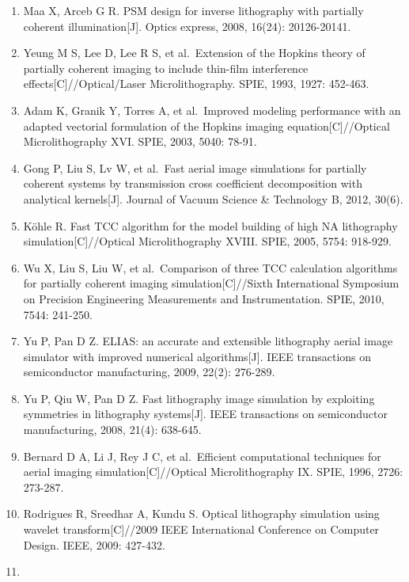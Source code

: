 \documentclass[
  preprint]{elsarticle}
\begin{document}
\begin{enumerate}
  Ma X, Arce G. Binary mask optimization for inverse lithography with
  partially coherent illumination{[}J{]}. Journal of the optical society
  of America A, 2008, 25(12): 2960-2970.
\item
  Maa X, Arceb G R. PSM design for inverse lithography with partially
  coherent illumination{[}J{]}. Optics express, 2008, 16(24):
  20126-20141.
\item
  Yeung M S, Lee D, Lee R S, et al.~Extension of the Hopkins theory of
  partially coherent imaging to include thin-film interference
  effects{[}C{]}//Optical/Laser Microlithography. SPIE, 1993, 1927:
  452-463.
\item
  Adam K, Granik Y, Torres A, et al.~Improved modeling performance with
  an adapted vectorial formulation of the Hopkins imaging
  equation{[}C{]}//Optical Microlithography XVI. SPIE, 2003, 5040:
  78-91.
\item
  Gong P, Liu S, Lv W, et al.~Fast aerial image simulations for
  partially coherent systems by transmission cross coefficient
  decomposition with analytical kernels{[}J{]}. Journal of Vacuum
  Science \& Technology B, 2012, 30(6).
\item
  Köhle R. Fast TCC algorithm for the model building of high NA
  lithography simulation{[}C{]}//Optical Microlithography XVIII. SPIE,
  2005, 5754: 918-929.
\item
  Wu X, Liu S, Liu W, et al.~Comparison of three TCC calculation
  algorithms for partially coherent imaging simulation{[}C{]}//Sixth
  International Symposium on Precision Engineering Measurements and
  Instrumentation. SPIE, 2010, 7544: 241-250.
\item
  Yu P, Pan D Z. ELIAS: an accurate and extensible lithography aerial
  image simulator with improved numerical algorithms{[}J{]}. IEEE
  transactions on semiconductor manufacturing, 2009, 22(2): 276-289.
\item
  Yu P, Qiu W, Pan D Z. Fast lithography image simulation by exploiting
  symmetries in lithography systems{[}J{]}. IEEE transactions on
  semiconductor manufacturing, 2008, 21(4): 638-645.
\item
  Bernard D A, Li J, Rey J C, et al.~Efficient computational techniques
  for aerial imaging simulation{[}C{]}//Optical Microlithography IX.
  SPIE, 1996, 2726: 273-287.
\item
  Rodrigues R, Sreedhar A, Kundu S. Optical lithography simulation using
  wavelet transform{[}C{]}//2009 IEEE International Conference on
  Computer Design. IEEE, 2009: 427-432.
\item

\end{enumerate}
\end{document}
